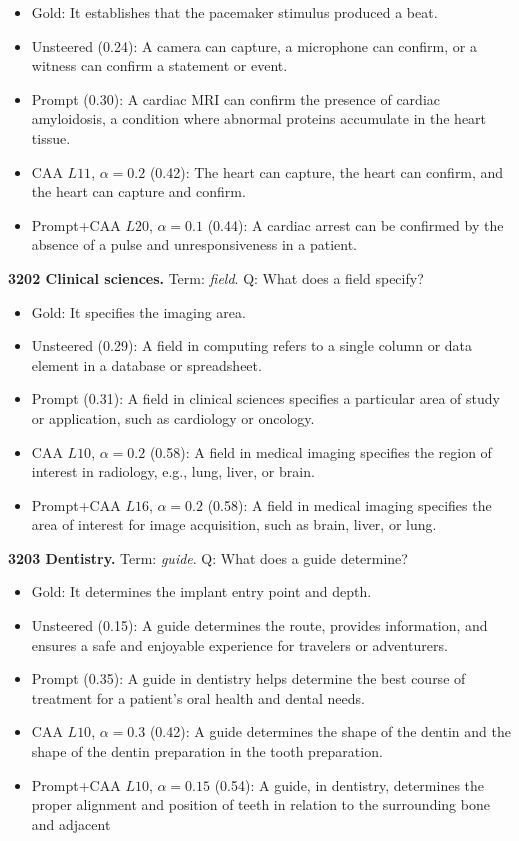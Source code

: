 \begin{itemize}\setlength{\itemsep}{0.15em}\setlength{\parsep}{0pt}\setlength{\topsep}{0.2em}
\item Gold: It establishes that the pacemaker stimulus produced a beat.
\item Unsteered (0.24): A camera can capture, a microphone can confirm, or a witness can confirm a statement or event.
\item Prompt (0.30): A cardiac MRI can confirm the presence of cardiac amyloidosis, a condition where abnormal proteins accumulate in the heart tissue.
\item CAA $L11$, $\alpha=0.2$ (0.42): The heart can capture, the heart can confirm, and the heart can capture and confirm.
\item Prompt+CAA $L20$, $\alpha=0.1$ (0.44): A cardiac arrest can be confirmed by the absence of a pulse and unresponsiveness in a patient.
\end{itemize}
\medskip\noindent\textbf{3202 Clinical sciences.} Term: \emph{field}.
Q: What does a field specify?
\begin{itemize}\setlength{\itemsep}{0.15em}\setlength{\parsep}{0pt}\setlength{\topsep}{0.2em}
\item Gold: It specifies the imaging area.
\item Unsteered (0.29): A field in computing refers to a single column or data element in a database or spreadsheet.
\item Prompt (0.31): A field in clinical sciences specifies a particular area of study or application, such as cardiology or oncology.
\item CAA $L10$, $\alpha=0.2$ (0.58): A field in medical imaging specifies the region of interest in radiology, e.g., lung, liver, or brain.
\item Prompt+CAA $L16$, $\alpha=0.2$ (0.58): A field in medical imaging specifies the area of interest for image acquisition, such as brain, liver, or lung.
\end{itemize}
\medskip\noindent\textbf{3203 Dentistry.} Term: \emph{guide}.
Q: What does a guide determine?
\begin{itemize}\setlength{\itemsep}{0.15em}\setlength{\parsep}{0pt}\setlength{\topsep}{0.2em}
\item Gold: It determines the implant entry point and depth.
\item Unsteered (0.15): A guide determines the route, provides information, and ensures a safe and enjoyable experience for travelers or adventurers.
\item Prompt (0.35): A guide in dentistry helps determine the best course of treatment for a patient's oral health and dental needs.
\item CAA $L10$, $\alpha=0.3$ (0.42): A guide determines the shape of the dentin and the shape of the dentin preparation in the tooth preparation.
\item Prompt+CAA $L10$, $\alpha=0.15$ (0.54): A guide, in dentistry, determines the proper alignment and position of teeth in relation to the surrounding bone and adjacent
\end{itemize}
